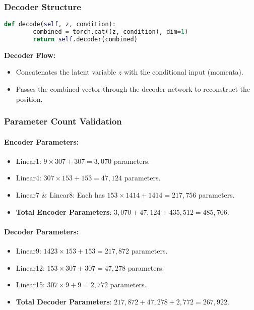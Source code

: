 \documentclass[10pt]{article}
\begin{document}
\subsubsection{Decoder Structure}
\begin{lstlisting}[language=Python, caption=Decoder Definition]
    def decode(self, z, condition):
        combined = torch.cat((z, condition), dim=1)
        return self.decoder(combined)
\end{lstlisting}

\textbf{Decoder Flow:}
\begin{itemize}
    \item Concatenates the latent variable \( z \) with the conditional input (momenta).
    \item Passes the combined vector through the decoder network to reconstruct the position.
\end{itemize}

\subsubsection{Parameter Count Validation}
\paragraph{Encoder Parameters:}
\begin{itemize}
    \item Linear1: \( 9 \times 307 + 307 = 3,070 \) parameters.
    \item Linear4: \( 307 \times 153 + 153 = 47,124 \) parameters.
    \item Linear7 \& Linear8: Each has \( 153 \times 1414 + 1414 = 217,756 \) parameters.
    \item \textbf{Total Encoder Parameters}: \( 3,070 + 47,124 + 435,512 = 485,706 \).
\end{itemize}

\paragraph{Decoder Parameters:}
\begin{itemize}
    \item Linear9: \( 1423 \times 153 + 153 = 217,872 \) parameters.
    \item Linear12: \( 153 \times 307 + 307 = 47,278 \) parameters.
    \item Linear15: \( 307 \times 9 + 9 = 2,772 \) parameters.
    \item \textbf{Total Decoder Parameters}: \( 217,872 + 47,278 + 2,772 = 267,922 \).
\end{itemize}
\end{document}
